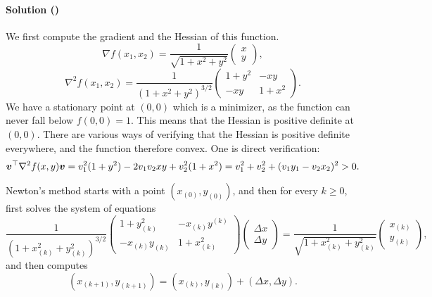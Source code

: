 \documentclass{article}
\newcounter{problems}
\renewcommand{\solution}[1]{\paragraph{Solution (\theproblems)}\addtocounter{problems}{1}\label{#1}}
\begin{document}
\solution{p5} We first compute the gradient and the Hessian of this function.
\begin{equation}\label{eq:grad}\tag{1}
 \nabla f(x_1,x_2) = \frac{1}{\sqrt{1+x^2+y^2}}\begin{pmatrix}
                                  x\\y
                                 \end{pmatrix},
\end{equation}
\begin{equation*}
 \nabla^2 f(x_1,x_2) = \frac{1}{(1+x^2+y^2)^{3/2}} \begin{pmatrix}
                         1+y^2 & -xy\\
                         -xy & 1+x^2
                       \end{pmatrix}.
\end{equation*}
We have a stationary point at $(0,0)$ which is a minimizer, as the function can never fall below $f(0,0)=1$. This means that the Hessian is positive definite at $(0,0)$. There are various ways of verifying that the Hessian is positive definite everywhere, and the function therefore convex. One is direct verification:
\begin{equation*}
 \bm{v}^{\top} \nabla^2f(x,y)\bm{v}
                                        = v_1^2(1+y^2)-2v_1v_2xy+v_2^2(1+x^2) = v_1^2+v_2^2+(v_1y_1-v_2x_2)^2>0.
\end{equation*}

Newton's method starts with a point $(x_{(0)},y_{(0)})$, and then for every $k\geq 0$, first solves the system of equations
\begin{equation*}
               \frac{1}{(1+x_{(k)}^2+y_{(k)}^2)^{3/2}} \begin{pmatrix}
                         1+y_{(k)}^2 & -x_{(k)}y^{(k)}\\
                         -x_{(k)}y_{(k)} & 1+x_{(k)}^2
                       \end{pmatrix}         
 \begin{pmatrix}
  \Delta x\\ \Delta y
 \end{pmatrix}
= \frac{1}{\sqrt{1+x_{(k)}^2+y_{(k)}^2}}\begin{pmatrix}
                                  x_{(k)}\\y_{(k)}
                                 \end{pmatrix},
\end{equation*}
and then computes
\begin{equation*}
 (x_{(k+1)},y_{(k+1)}) = (x_{(k)},y_{(k)}) + (\Delta x,\Delta y).
\end{equation*}
\end{document}
